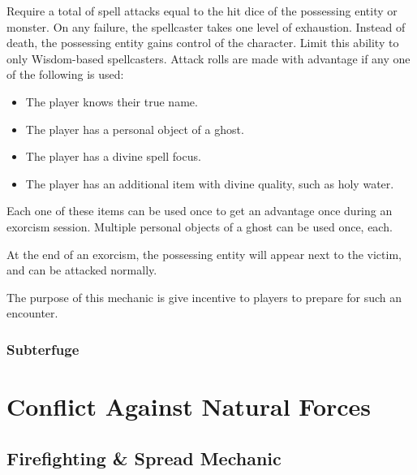 \documentclass[twocolumn]{dndbook}
\begin{document}

Require a total of spell attacks equal to the hit dice of the possessing entity or monster.
On any failure, the spellcaster takes one level of exhaustion. Instead of death, the possessing entity gains control of the character.
Limit this ability to only Wisdom-based spellcasters. %
Attack rolls are made with advantage if any one of the following is used:
\begin{itemize}
	\item The player knows their true name.
	\item The player has a personal object of a ghost.
	\item The player has a divine spell focus.
	\item The player has an additional item with divine quality, such as holy water.
\end{itemize}

Each one of these items can be used once to get an advantage once during an exorcism session.
Multiple personal objects of a ghost can be used once, each.

At the end of an exorcism, the possessing entity will appear next to the victim, and can be attacked normally.\par

The purpose of this mechanic is give incentive to players to prepare for such an encounter.\par


\subsection{Subterfuge}


\chapter{Conflict Against Natural Forces}
\section{Firefighting \& Spread Mechanic}
\end{document}
